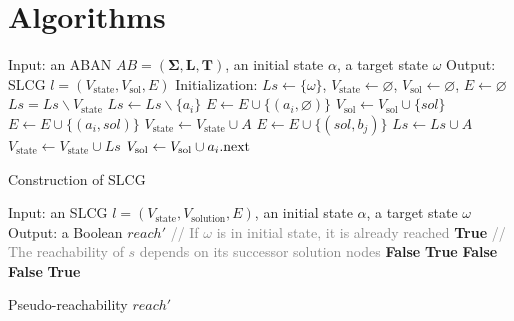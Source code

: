 \documentclass{article}
\theoremstyle{definition}
\newcommand{\st}{{\mathrm{state}}}
\newcommand{\sol}{{\mathrm{sol}}}
\begin{document}
\section{Algorithms}\label{appendix:algo}

\begin{algorithm}[ht]
\begin{algorithmic}
\State Input: an ABAN $AB=(\mathbf{\Sigma},\mathbf{L},\mathbf{T})$, an initial state $\alpha$, a target state $\omega$
\State Output: SLCG $l=(V_\st,V_\sol, E)$
\State Initialization: 
$Ls\gets \{\omega\}$, $V_\st\gets\varnothing$, $V_\sol\gets \varnothing$, $E\gets \varnothing$
    \State $Ls=Ls\backslash V_\st$
		\State $Ls\gets Ls\backslash \{a_i\}$
			\State $E\gets E\cup \{(a_i,\varnothing)\} $
    	\Else
    		    \State $V_\sol\gets V_\sol\cup \{sol\}$
    		    \State $E\gets E\cup \{(a_i,sol)\} $
    			\State $V_\st\gets V_\st\cup {A}$
    				\State $E\gets E\cup \{(sol,b_j)\} $
    			\EndFor
    			\State $Ls\gets Ls\cup A$
                \State $V_\st\gets V_\st\cup Ls$
    		\EndFor
    		\State$V_\sol\gets V_\sol\cup a_i{\rm .next}$           
    	\EndIf
	\EndFor
\EndWhile
\State\Return{$(V_\st,V_\sol,E)$}
\end{algorithmic}
\caption{Construction of SLCG}\label{AlgConstructLCG}
\end{algorithm}

\begin{algorithm}[ht]
\begin{algorithmic}
\State Input: an SLCG $l=(V_\st, {V_\mathrm{solution}},E)$, an initial state $\alpha$, a target state $\omega$
\State Output: a Boolean $reach'$
\State \textcolor{gray}{// If $\omega$ is in initial state, it is already reached}
\If {$\omega\in \alpha$}
   \Return \textbf{True}
\EndIf
\State \textcolor{gray}{// The reachability of $s$ depends on its successor solution nodes}
    \Return \textbf{False}
\EndIf
{}
    \Return \textbf{True}
    \EndIf
\EndFor
 \Return \textbf{False}
\EndProcedure
{}
    \Return \textbf{False}
    \EndIf
\EndFor
\Return \textbf{True}
\EndProcedure
\end{algorithmic}
\caption{Pseudo-reachability $reach'$}\label{algPseudo}
\end{algorithm}
\end{document}

